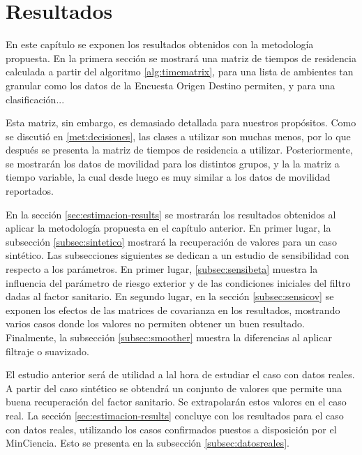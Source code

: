 \chapter{Resultados} \label{chap:results}


En este capítulo se exponen los resultados obtenidos con la metodología propuesta. En la primera sección se mostrará una matriz de tiempos de residencia calculada a partir del algoritmo \ref{alg:timematrix}, para una lista de ambientes tan granular como los datos de la Encuesta Origen Destino permiten, y para una clasificación...

Esta matriz, sin embargo, es demasiado detallada para nuestros propósitos. Como se discutió en \ref{met:decisiones}, las clases a utilizar son muchas menos, por lo que después se presenta la matriz de tiempos de residencia a utilizar. Posteriormente, se mostrarán los datos de movilidad para los distintos grupos, y la la matriz a tiempo variable, la cual desde luego es muy similar a los datos de movilidad reportados. 

En la sección \ref{sec:estimacion-results} se mostrarán los resultados obtenidos al aplicar la metodología propuesta en el capítulo anterior. En primer lugar, la subsección \ref{subsec:sintetico} mostrará la recuperación de valores para un caso sintético. Las subsecciones siguientes se dedican a un estudio de sensibilidad con respecto a los parámetros. En primer lugar, \ref{subsec:sensibeta} muestra la influencia del parámetro de riesgo exterior y de las condiciones iniciales del filtro dadas al factor sanitario. En segundo lugar, en la sección \ref{subsec:sensicov} se exponen los efectos de las matrices de covarianza en los resultados, mostrando varios casos donde los valores no permiten obtener un buen resultado. Finalmente, la subsección \ref{subsec:smoother} muestra la diferencias al aplicar filtraje o suavizado.


El estudio anterior será de utilidad a lal hora de estudiar el caso con datos reales. A partir del caso sintético se obtendrá un conjunto de valores que permite una buena recuperación del factor sanitario. Se extrapolarán estos valores en el caso real. La sección \ref{sec:estimacion-results} concluye con los resultados para el caso con datos reales, utilizando los casos confirmados puestos a disposición por el MinCiencia. Esto se presenta en la subsección \ref{subsec:datosreales}.

